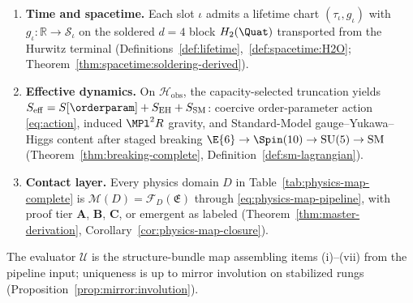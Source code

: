 \begin{theorem}
\begin{enumerate}[label=(\roman*),leftmargin=*]
    the measure factorizes
    $d\mu_\Gamma=d\mu_{\Gamma_{-1}}\otimes d\mu_{\Gamma_{+1}}$
    (Theorem~\ref{thm:duality}, Theorem~\ref{thm:sigma-measure}).
  \item \textbf{Time and spacetime.}
    Each slot $\iota$ admits a lifetime chart
    $(\tau_\iota,g_\iota)$ with $g_\iota:\mathbb{R}\to\mathcal{S}_\iota$ on the
    soldered $d=4$ block $H_2(\Quat)$ transported from the Hurwitz terminal
    (Definitions~\ref{def:lifetime},~\ref{def:spacetime:H2O};
    Theorem~\ref{thm:spacetime:soldering-derived}).
  \item \textbf{Effective dynamics.}
    On $\mathcal{H}_{\mathrm{obs}}$, the capacity-selected truncation yields
    $S_{\mathrm{eff}}=S[\orderparam]+S_{\mathrm{EH}}+S_{\mathrm{SM}}$:
    coercive order-parameter action \eqref{eq:action}, induced
    $\MPl^2 R$ gravity, and Standard-Model gauge--Yukawa--Higgs content after
    staged breaking $\E{6}\to\Spin(10)\to\mathrm{SU}(5)\to\mathrm{SM}$
    (Theorem~\ref{thm:breaking-complete}, Definition~\ref{def:sm-lagrangian}).
  \item \textbf{Contact layer.}
    Every physics domain $D$ in Table~\ref{tab:physics-map-complete} is
    $\mathcal{M}(D)=\mathcal{F}_D(\mathfrak{E})$ through
    \eqref{eq:physics-map-pipeline}, with proof tier \textbf{A}, \textbf{B},
    \textbf{C}, or emergent as labeled
    (Theorem~\ref{thm:master-derivation},
    Corollary~\ref{cor:physics-map-closure}).
\end{enumerate}
The evaluator $\mathcal{U}$ is the structure-bundle map assembling items
(i)--(vii) from the pipeline input; uniqueness is up to mirror involution on
stabilized rungs (Proposition~\ref{prop:mirror:involution}).
\end{theorem}

